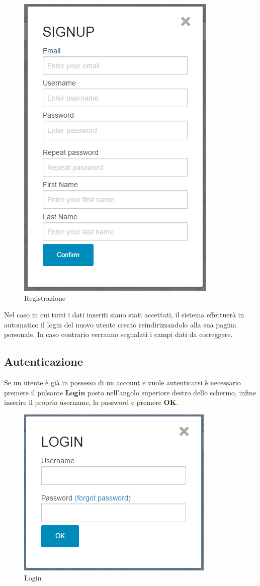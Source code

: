 \begin{figure}[H] 
	\centering 
	\includegraphics[scale=0.40] {img/signup.png}
	\caption{Registrazione} 
\end{figure}


\noindent Nel caso in cui tutti i dati inseriti siano stati accettati, il sistema effettuerà in automatico il login del nuovo utente creato reindirizzandolo alla sua pagina personale.
In caso contrario verranno segnalati i campi dati da correggere.

\subsection{Autenticazione}
Se un utente è già in possesso di un account e vuole autenticarsi è necessario premere il pulsante \textbf{Login} posto nell'angolo superiore destro dello schermo, infine inserire il proprio username, la password e premere \textbf{OK}.

\begin{figure}[h] 
	\centering 
	\includegraphics[scale=0.40] {img/login.png}
	\caption{Login} 
\end{figure}

